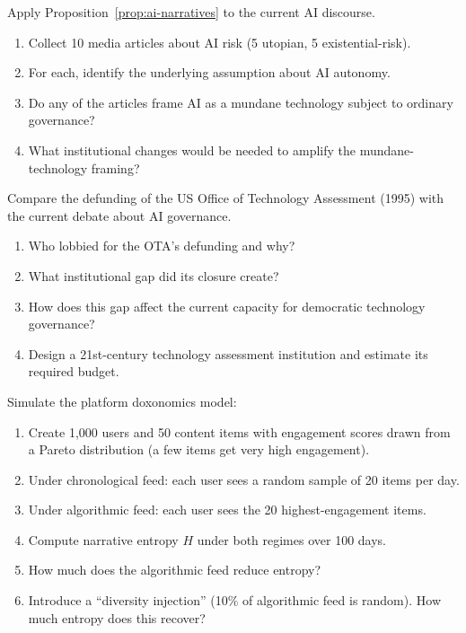 \begin{exercise}
Apply Proposition~\ref{prop:ai-narratives} to the current AI discourse.
\begin{enumerate}[nosep]
  \item Collect 10 media articles about AI risk (5 utopian, 5 existential-risk).
  \item For each, identify the underlying assumption about AI autonomy.
  \item Do any of the articles frame AI as a mundane technology subject to ordinary governance?
  \item What institutional changes would be needed to amplify the mundane-technology framing?
\end{enumerate}
\end{exercise}

\begin{exercise}
Compare the defunding of the US Office of Technology Assessment (1995) with the current debate about AI governance.
\begin{enumerate}[nosep]
  \item Who lobbied for the OTA's defunding and why?
  \item What institutional gap did its closure create?
  \item How does this gap affect the current capacity for democratic technology governance?
  \item Design a 21st-century technology assessment institution and estimate its required budget.
\end{enumerate}
\end{exercise}

\begin{exercise}[Computational]
Simulate the platform doxonomics model:
\begin{enumerate}[nosep]
  \item Create 1,000 users and 50 content items with engagement scores drawn from a Pareto distribution (a few items get very high engagement).
  \item Under chronological feed: each user sees a random sample of 20 items per day.
  \item Under algorithmic feed: each user sees the 20 highest-engagement items.
  \item Compute narrative entropy $H$ under both regimes over 100 days.
  \item How much does the algorithmic feed reduce entropy?
  \item Introduce a ``diversity injection'' (10\% of algorithmic feed is random). How much entropy does this recover?
\end{enumerate}
\end{exercise}
